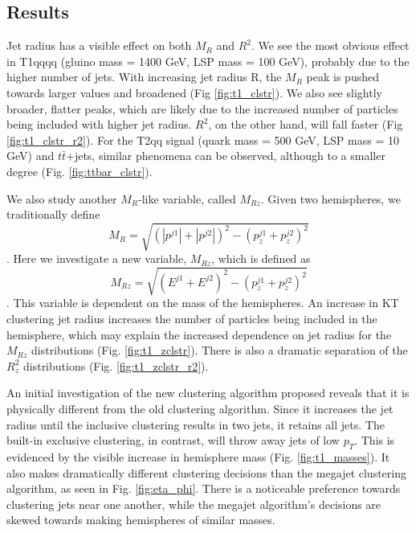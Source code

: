 \documentclass[twocolumn,aps,prd,reprint]{revtex4-1}
\begin{document}
\subsection{Results}
Jet radius has a visible effect on both $M_R$ and $R^{2}$. We see the most obvious effect in T1qqqq (gluino mass = 1400 GeV, LSP mass = 100 GeV), probably due to the higher number of jets. With increasing jet radius R, the $M_R$ peak is pushed towards larger values and broadened (Fig \ref{fig:t1_clstr}). We also see slightly broader, flatter peaks, which are likely due to the increased number of particles being included with higher jet radius. $R^2$, on the other hand, will fall faster (Fig \ref{fig:t1_clstr_r2}).  For the T2qq signal (quark mass = 500 GeV, LSP mass = 10 GeV) and $t\bar{t}$+jets, similar phenomena can be observed, although to a smaller degree (Fig. \ref{fig:ttbar_clstr}).
\par We also study another $M_R$-like variable, called $M_{Rz}$. Given two hemispheres, we traditionally define $$M_R = \sqrt{(|p^{j1}|+|p^{j2}|)^2-(p_z^{j1}+p_z^{j2})^2}$$ \cite{razor}. Here we investigate a new variable, $M_{Rz}$, which is defined as $$M_{Rz} = \sqrt{(E^{j1}+E^{j2})^2-(p_z^{j1}+p_z^{j2})^2}$$ \cite{talk}. This variable is dependent on the mass of the hemispheres. An increase in KT clustering jet radius increases the number of particles being included in the hemisphere, which may explain the increased dependence on jet radius for the $M_{Rz}$ distributions (Fig. \ref{fig:t1_zclstr}). There is also a dramatic separation of the $R^2_z$ distributions (Fig. \ref{fig:t1_zclstr_r2}). 
\par An initial investigation of the new clustering algorithm proposed reveals that it is physically different from the old clustering algorithm. Since it increases the jet radius until the inclusive clustering results in two jets, it retains all jets. The built-in exclusive clustering, in contrast, will throw away jets of low $p_T$. This is evidenced by the visible increase in hemisphere mass (Fig. \ref{fig:t1_masses}). It also makes dramatically different clustering decisions than the megajet clustering algorithm, as seen in Fig. \ref{fig:eta_phi}. There is a noticeable preference towards clustering jets near one another, while the megajet algorithm's decisions are skewed towards making hemispheres of similar masses. 
\onecolumngrid
\end{document}
